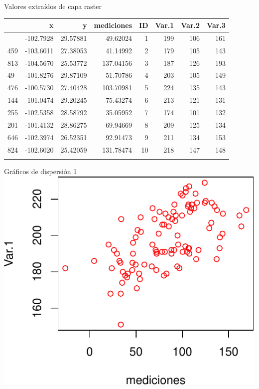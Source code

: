 \documentclass[
  11pt,
  ignorenonframetext,
]{beamer}
\begin{document}
\begin{frame}{Valores extraídos de capa raster}
\protect\hypertarget{valores-extrauxeddos-de-capa-raster}{}
\begin{longtable}[]{@{}lrrrrrrr@{}}
\toprule\noalign{}
& x & y & mediciones & ID & Var.1 & Var.2 & Var.3 \\
\midrule\noalign{}
\endhead
73 & -102.7928 & 29.57881 & 49.62024 & 1 & 199 & 106 & 161 \\
459 & -103.6011 & 27.38053 & 41.14992 & 2 & 179 & 105 & 143 \\
813 & -104.5670 & 25.53772 & 137.04156 & 3 & 187 & 126 & 193 \\
49 & -101.8276 & 29.87109 & 51.70786 & 4 & 203 & 105 & 149 \\
476 & -100.5730 & 27.40428 & 103.70981 & 5 & 224 & 135 & 143 \\
144 & -101.0474 & 29.20245 & 75.43274 & 6 & 213 & 121 & 131 \\
255 & -102.5358 & 28.58792 & 35.05952 & 7 & 174 & 101 & 132 \\
201 & -101.4132 & 28.86275 & 69.94669 & 8 & 209 & 125 & 134 \\
646 & -102.3974 & 26.52351 & 92.91473 & 9 & 211 & 134 & 153 \\
824 & -102.6020 & 25.42059 & 131.78474 & 10 & 218 & 147 & 148 \\
\bottomrule\noalign{}
\end{longtable}
\end{frame}

\begin{frame}{Gráficos de dispersión 1}
\protect\hypertarget{gruxe1ficos-de-dispersiuxf3n-1}{}
\includegraphics{Correlacion-espacial_files/figure-beamer/unnamed-chunk-13-1.pdf}
\end{frame}
\end{document}
